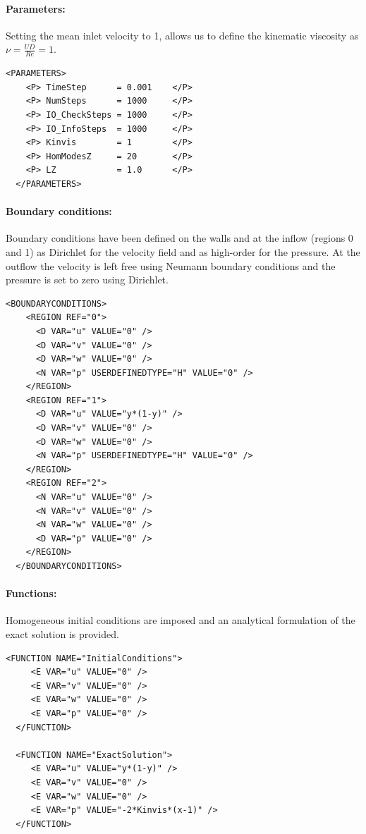 \paragraph{Parameters:~} Setting the mean inlet velocity to 1, allows us to define the kinematic viscosity as $\nu = \frac{UD}{Re}=1$.
\begin{lstlisting}[style=XMLStyle]
  <PARAMETERS>
    <P> TimeStep      = 0.001    </P>
    <P> NumSteps      = 1000     </P>
    <P> IO_CheckSteps = 1000     </P>
    <P> IO_InfoSteps  = 1000     </P>
    <P> Kinvis        = 1        </P>
    <P> HomModesZ     = 20       </P>
    <P> LZ            = 1.0      </P>
  </PARAMETERS>
\end{lstlisting}

\paragraph{Boundary conditions:~} Boundary conditions have been defined on the walls and at the inflow (regions 0 and 1) as Dirichlet for the velocity field and as high-order for the pressure. At the outflow the velocity is left free using Neumann boundary conditions and the pressure is set to zero using Dirichlet.
\begin{lstlisting}[style=XMLStyle]
  <BOUNDARYCONDITIONS>
    <REGION REF="0">
      <D VAR="u" VALUE="0" />
      <D VAR="v" VALUE="0" />
      <D VAR="w" VALUE="0" />
      <N VAR="p" USERDEFINEDTYPE="H" VALUE="0" />
    </REGION>
    <REGION REF="1">
      <D VAR="u" VALUE="y*(1-y)" />
      <D VAR="v" VALUE="0" />
      <D VAR="w" VALUE="0" />
      <N VAR="p" USERDEFINEDTYPE="H" VALUE="0" />
    </REGION>
    <REGION REF="2">
      <N VAR="u" VALUE="0" />
      <N VAR="v" VALUE="0" />
      <N VAR="w" VALUE="0" />
      <D VAR="p" VALUE="0" />
    </REGION>
  </BOUNDARYCONDITIONS>
\end{lstlisting}

\paragraph{Functions:~} Homogeneous initial conditions are imposed and an analytical formulation of the exact solution is provided.
\begin{lstlisting}[style=XMLStyle]
  <FUNCTION NAME="InitialConditions">
     <E VAR="u" VALUE="0" />
     <E VAR="v" VALUE="0" />
     <E VAR="w" VALUE="0" />
     <E VAR="p" VALUE="0" />
  </FUNCTION>

  <FUNCTION NAME="ExactSolution">
     <E VAR="u" VALUE="y*(1-y)" />
     <E VAR="v" VALUE="0" />
     <E VAR="w" VALUE="0" />
     <E VAR="p" VALUE="-2*Kinvis*(x-1)" />
  </FUNCTION>
\end{lstlisting}


